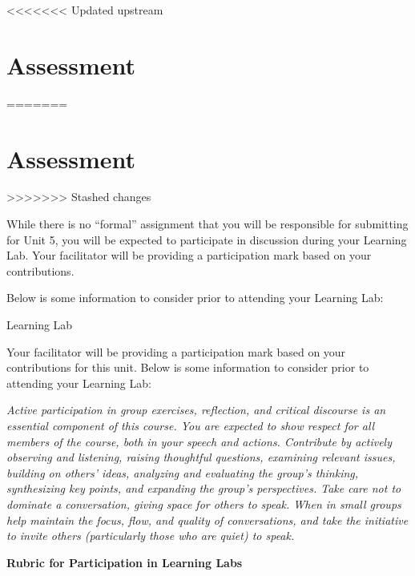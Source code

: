 \documentclass[
]{book}
\begin{document}
<<<<<<< Updated upstream
\hypertarget{assessment-4}{%
\section*{Assessment}\label{assessment-4}}
=======
\hypertarget{assessment-3}{%
\section*{Assessment}\label{assessment-3}}
>>>>>>> Stashed changes

\begin{assessment}
While there is no ``formal'' assignment that you will be responsible for submitting for Unit 5, you will be expected to participate in discussion during your Learning Lab. Your facilitator will be providing a participation mark based on your contributions.

Below is some information to consider prior to attending your Learning Lab:

{Learning Lab}

Your facilitator will be providing a participation mark based on your contributions for this unit. Below is some information to consider prior to attending your Learning Lab:

\emph{Active participation in group exercises, reflection, and critical discourse is an essential component of this course. You are expected to show respect for all members of the course, both in your speech and actions. Contribute by actively observing and listening, raising thoughtful questions, examining relevant issues, building on others' ideas, analyzing and evaluating the group's thinking, synthesizing key points, and expanding the group's perspectives. Take care not to dominate a conversation, giving space for others to speak. When in small groups help maintain the focus, flow, and quality of conversations, and take the initiative to invite others (particularly those who are quiet) to speak.}

\textbf{Rubric for Participation in Learning Labs}


\end{assessment}
\end{document}
